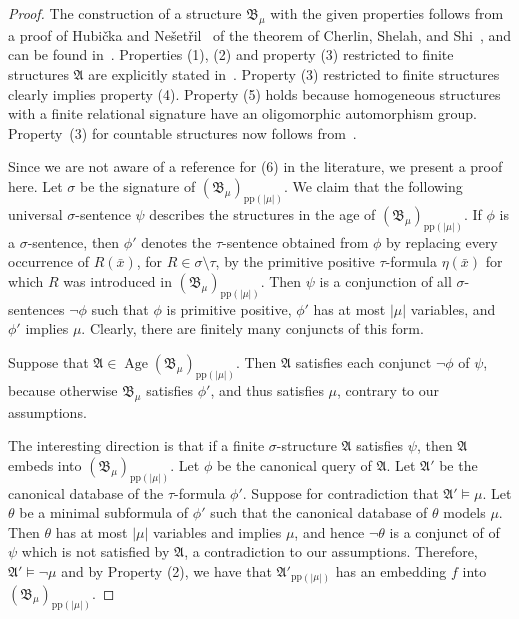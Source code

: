 \documentclass[nonacm]{acmart}
\newcommand{\bA}{{\mathfrak A}}
\newcommand{\bB}{{\mathfrak B}}
\DeclareMathOperator{\Age}{Age}
\begin{document}
\begin{proof}
The construction of a structure $\bB_{\mu}$ 
with the given properties 
follows from a proof of Hubi\v{c}ka and Ne\v{s}et\v{r}il~\cite{Hubicka-Nesetril,Hubicka-Nesetril-ForbiddenHomomorphisms} of the theorem of Cherlin, Shelah, and Shi~\cite{CherlinShelahShi}, and can be found in~\cite[Theorem 4.3.8]{Book}. 
Properties (1), (2) and property (3) restricted to finite structures $\bA$ are explicitly stated in~\cite[Theorem 4.3.8]{Book}. 
Property (3) restricted to finite structures clearly implies property (4). Property (5) holds because homogeneous structures with a finite relational signature have an oligomorphic automorphism group. 
Property~(3) for countable structures now follows from~\cite[Lemma 4.1.7]{Book}. 


Since we are not aware of a reference for (6) in the literature, we present a proof here. Let $\sigma$ be the signature of $(\bB_\mu)_{\text{pp}(|\mu|)}$.
We claim that the following universal $\sigma$-sentence $\psi$ describes the structures in the age of
$(\bB_\mu)_{\text{pp}(|\mu|)}$. 
If $\phi$ is a $\sigma$-sentence, then $\phi'$ denotes the $\tau$-sentence obtained from $\phi$ by replacing every occurrence of $R(\bar x)$, for $R \in \sigma \setminus \tau$, 
by the primitive positive $\tau$-formula $\eta(\bar x)$ for which $R$ was introduced in $(\bB_\mu)_{\text{pp}(|\mu|)}$.
Then $\psi$
is a conjunction
of all $\sigma$-sentences $\neg \phi$ such that $\phi$ is primitive positive, 
$\phi'$ has at most $|\mu|$ variables, and $\phi'$ implies $\mu$. 
Clearly, there are finitely many conjuncts of this form.


Suppose that $\bA \in \Age(\bB_\mu)_{\text{pp}(|\mu|)}$.
Then $\bA$ satisfies each conjunct $\neg \phi$ of $\psi$, because otherwise $\bB_{\mu}$ satisfies $\phi'$, and thus satisfies $\mu$, contrary to our assumptions.

The interesting direction is that if a finite $\sigma$-structure $\bA$ satisfies $\psi$, then $\bA$ embeds into $(\bB_\mu)_{\text{pp}(|\mu|)}$. 
Let $\phi$ be the canonical query of $\bA$.
Let $\bA'$ be the canonical database of the $\tau$-formula $\phi'$. 
Suppose for contradiction that $\bA' \models \mu$. 
Let $\theta$ be a minimal subformula of $\phi'$ such that
the canonical database of $\theta$ models $\mu$. 
Then $\theta$ has at most $|\mu|$ variables and implies $\mu$, and hence $\neg \theta$ is a conjunct of of $\psi$ which is not satisfied by $\bA$, a contradiction to our assumptions.
Therefore, $\bA' \models \neg \mu$ and by Property (2), we have that $\bA'_{\text{pp}(|\mu|)}$
has an embedding $f$ into $(\bB_\mu)_{\text{pp}(|\mu|)}$.


\end{proof}
\end{document}
